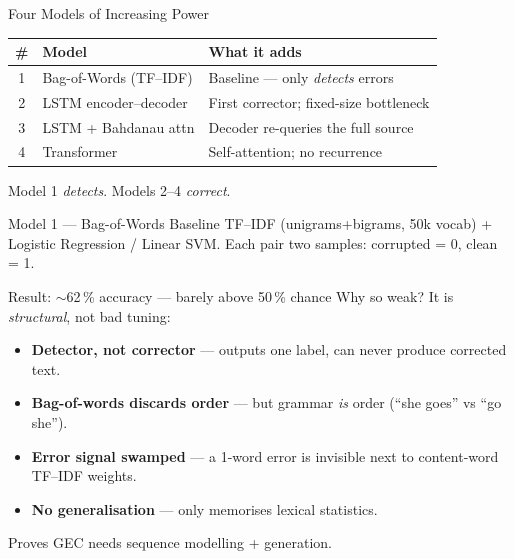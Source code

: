 \documentclass[aspectratio=169,11pt]{beamer}
\begin{document}
\begin{frame}{Four Models of Increasing Power}
\begin{tabular}{cll}
\toprule
\# & Model & What it adds \\
\midrule
1 & Bag-of-Words (TF--IDF) & Baseline --- only \emph{detects} errors \\
2 & LSTM encoder--decoder  & First corrector; fixed-size bottleneck \\
3 & LSTM + Bahdanau attn   & Decoder re-queries the full source \\
4 & Transformer            & Self-attention; no recurrence \\
\bottomrule
\end{tabular}
\vspace{1em}
\begin{center}
\small Model 1 \emph{detects}. Models 2--4 \emph{correct}.
\end{center}
\end{frame}

\begin{frame}{Model 1 --- Bag-of-Words Baseline}
TF--IDF (unigrams+bigrams, 50k vocab) + Logistic Regression / Linear SVM.
Each pair \textrightarrow{} two samples: corrupted = 0, clean = 1.
\vspace{0.5em}
\begin{block}{Result: $\sim$62\,\% accuracy --- barely above 50\,\% chance}
\small Why so weak? It is \emph{structural}, not bad tuning:
\begin{itemize}\small
  \item \textbf{Detector, not corrector} --- outputs one label, can never
        produce corrected text.
  \item \textbf{Bag-of-words discards order} --- but grammar \emph{is} order
        (``she goes'' vs ``go she'').
  \item \textbf{Error signal swamped} --- a 1-word error is invisible next to
        content-word TF--IDF weights.
  \item \textbf{No generalisation} --- only memorises lexical statistics.
\end{itemize}
\end{block}
\centering \small Proves GEC needs sequence modelling + generation.
\end{frame}
\end{document}
